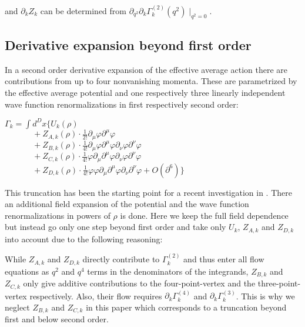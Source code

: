 \documentclass[a4paper,aps,prl,twocolumn,groupedaddress]{revtex4}
\begin{document}
\bigskip
\noindent
and $ \partial_k Z_k $ can be determined from $ \partial_{q^2} \partial_k \Gamma_k^{(2)}(q^2) \mid_{q^2=0} $.





\newpage
\subsection*{Derivative expansion beyond first order}

\noindent
In a second order derivative expansion of the effective average action there are
contributions from up to four nonvanishing momenta. These are parametrized by the
effective average potential and one respectively three linearly independent wave
function renormalizations in first respectively second order:

\bigskip $ \Gamma_k = \int \limits d^Dx \{ U_k(\rho) $\\
$ ~~~~~~~~~~~~~~\; + Z_{A,k}(\rho) \cdot \frac{1}{2!} \partial_\mu \varphi \partial^\mu \varphi $\\
$ ~~~~~~~~~~~~~~\; + Z_{B,k}(\rho) \cdot \frac{1}{4!} \partial_\mu \varphi \partial^\mu \varphi \partial_\nu \varphi \partial^\nu \varphi $\\
$ ~~~~~~~~~~~~~~\; + Z_{C,k}(\rho) \cdot \frac{1}{4!} \varphi \partial_\mu \partial^\mu \varphi \partial_\nu \varphi \partial^\nu \varphi $\\
$ ~~~~~~~~~~~~~~\; + Z_{D,k}(\rho) \cdot \frac{1}{4!} \varphi \varphi \partial_\mu \partial^\mu \varphi \partial_\nu \partial^\nu \varphi + O(\partial^6) \} $

\bigskip
\noindent
This truncation has been the starting point for a recent investigation in \cite{Lit5a}. There an additional field expansion of the potential and 
the wave function renormalizations in powers of $\rho$ is done. Here we keep the full field dependence but instead go 
only one step beyond first order and take only $U_k$, $Z_{A,k}$ and $Z_{D,k}$ into account due to the following reasoning:

\bigskip
\noindent
While $Z_{A,k}$ and $Z_{D,k}$ directly contribute to $ \Gamma_k^{(2)} $ and thus enter all flow 
equations as $q^2$ and $q^4$ terms in the denominators of the integrands, $Z_{B,k}$ and $Z_{C,k}$
only give additive contributions to the four-point-vertex and the three-point-vertex respectively. 
Also, their flow requires $\partial_k \Gamma_k^{(4)}$ and $\partial_k \Gamma_k^{(3)}$. 
This is why we neglect $Z_{B,k}$ and $Z_{C,k}$ in this paper which corresponds to a truncation 
beyond first and below second order.
\end{document}
